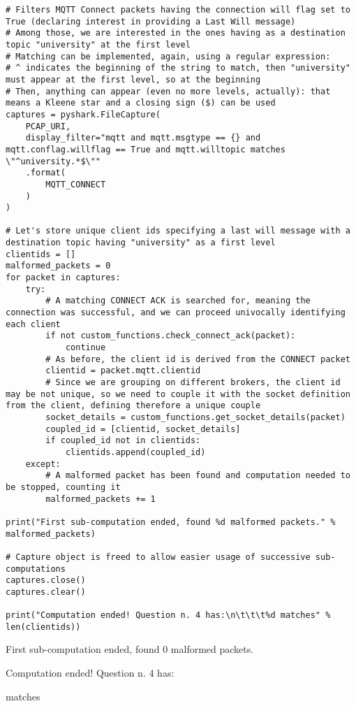 \documentclass[a4paper,11pt]{article} %
\begin{document}
    \begin{verbatim}
# Filters MQTT Connect packets having the connection will flag set to True (declaring interest in providing a Last Will message)
# Among those, we are interested in the ones having as a destination topic "university" at the first level
# Matching can be implemented, again, using a regular expression:
# ^ indicates the beginning of the string to match, then "university" must appear at the first level, so at the beginning
# Then, anything can appear (even no more levels, actually): that means a Kleene star and a closing sign ($) can be used
captures = pyshark.FileCapture(
    PCAP_URI,
    display_filter="mqtt and mqtt.msgtype == {} and mqtt.conflag.willflag == True and mqtt.willtopic matches \"^university.*$\""
    .format(
        MQTT_CONNECT
    )
)

# Let's store unique client ids specifying a last will message with a destination topic having "university" as a first level
clientids = []
malformed_packets = 0
for packet in captures:
    try:
        # A matching CONNECT ACK is searched for, meaning the connection was successful, and we can proceed univocally identifying each client
        if not custom_functions.check_connect_ack(packet):
            continue
        # As before, the client id is derived from the CONNECT packet
        clientid = packet.mqtt.clientid
        # Since we are grouping on different brokers, the client id may be not unique, so we need to couple it with the socket definition from the client, defining therefore a unique couple
        socket_details = custom_functions.get_socket_details(packet)
        coupled_id = [clientid, socket_details]
        if coupled_id not in clientids:
            clientids.append(coupled_id)
    except:
        # A malformed packet has been found and computation needed to be stopped, counting it
        malformed_packets += 1

print("First sub-computation ended, found %d malformed packets." % malformed_packets)

# Capture object is freed to allow easier usage of successive sub-computations
captures.close()
captures.clear()

print("Computation ended! Question n. 4 has:\n\t\t\t%d matches" % len(clientids))
    \end{verbatim}

    \begin{tcolorbox}
        First sub-computation ended, found 0 malformed packets.

        Computation ended! Question n. 4 has:

        \qquad \qquad {} matches
    \end{tcolorbox}
\end{document}
